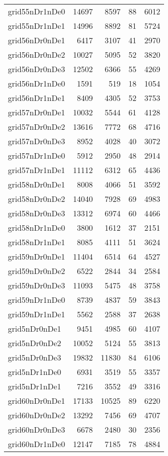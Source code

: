 \begin{longtable}{lrrrr}
grid55nDr1nDe0 & 14697 & 8597 & 88 & 6012 \\
grid55nDr1nDe1 & 14996 & 8892 & 81 & 5724 \\
grid56nDr0nDe1 & 6417 & 3107 & 41 & 2970 \\
grid56nDr0nDe2 & 10027 & 5095 & 52 & 3820 \\
grid56nDr0nDe3 & 12502 & 6366 & 55 & 4269 \\
grid56nDr1nDe0 & 1591 & 519 & 18 & 1054 \\
grid56nDr1nDe1 & 8409 & 4305 & 52 & 3753 \\
grid57nDr0nDe1 & 10032 & 5544 & 61 & 4128 \\
grid57nDr0nDe2 & 13616 & 7772 & 68 & 4716 \\
grid57nDr0nDe3 & 8952 & 4028 & 40 & 3072 \\
grid57nDr1nDe0 & 5912 & 2950 & 48 & 2914 \\
grid57nDr1nDe1 & 11112 & 6312 & 65 & 4436 \\
grid58nDr0nDe1 & 8008 & 4066 & 51 & 3592 \\
grid58nDr0nDe2 & 14040 & 7928 & 69 & 4983 \\
grid58nDr0nDe3 & 13312 & 6974 & 60 & 4466 \\
grid58nDr1nDe0 & 3800 & 1612 & 37 & 2151 \\
grid58nDr1nDe1 & 8085 & 4111 & 51 & 3624 \\
grid59nDr0nDe1 & 11404 & 6514 & 64 & 4527 \\
grid59nDr0nDe2 & 6522 & 2844 & 34 & 2584 \\
grid59nDr0nDe3 & 11093 & 5475 & 48 & 3758 \\
grid59nDr1nDe0 & 8739 & 4837 & 59 & 3843 \\
grid59nDr1nDe1 & 5562 & 2588 & 37 & 2638 \\
grid5nDr0nDe1 & 9451 & 4985 & 60 & 4107 \\
grid5nDr0nDe2 & 10052 & 5124 & 55 & 3813 \\
grid5nDr0nDe3 & 19832 & 11830 & 84 & 6106 \\
grid5nDr1nDe0 & 6931 & 3519 & 55 & 3357 \\
grid5nDr1nDe1 & 7216 & 3552 & 49 & 3316 \\
grid60nDr0nDe1 & 17133 & 10525 & 89 & 6220 \\
grid60nDr0nDe2 & 13292 & 7456 & 69 & 4707 \\
grid60nDr0nDe3 & 6678 & 2480 & 30 & 2356 \\
grid60nDr1nDe0 & 12147 & 7185 & 78 & 4884 \\

\end{longtable}
